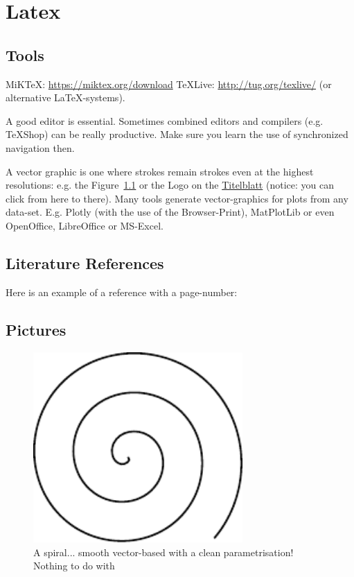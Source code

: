 \chapter{Latex}

\section{Tools}

MiKTeX: \url{https://miktex.org/download}
TeXLive: \url{http://tug.org/texlive/}
 (or alternative LaTeX-systems).
 
 A good editor is essential. Sometimes combined editors and compilers (e.g. TeXShop) can be really productive. Make sure you learn the use of synchronized navigation then.

A vector graphic is one where strokes remain strokes even at the highest resolutions: e.g. the Figure~\ref{fig:spiral} or the Logo on the \hyperref[titlePage]{Titelblatt} (notice: you can click from here to there).
Many tools generate vector-graphics for plots from any data-set. E.g. Plotly (with the use of the Browser-Print), MatPlotLib or even OpenOffice, LibreOffice or MS-Excel.

\section{Literature References}
Here is an example of a reference with a page-number: \textcite[p.~6]{DueckKo:2016}


\section{Pictures}

\begin{figure}[h]
\centering
\includegraphics[width=8cm]{pics/spiral.pdf}
\caption{A spiral... smooth vector-based with a clean parametrisation! \\ Nothing to do with \textcite{Gage:18}}\label{fig:spiral}
\end{figure}
\FloatBarrier

